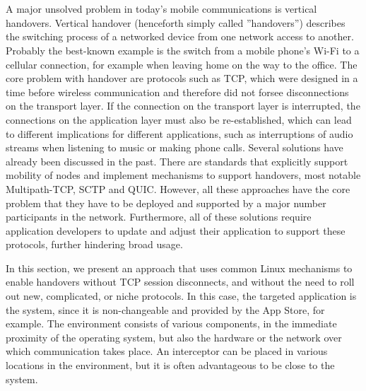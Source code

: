 \section{\wgh}
\label{sec:wg:impl}

\newcommand{\ld}{\texttt{LD\_PRELOAD}\xspace}

A major unsolved problem in today's mobile communications is vertical handovers.
Vertical handover (henceforth simply called ''handovers'') describes the switching process of a networked device from one network access to another.
Probably the best-known example is the switch from a mobile phone's Wi-Fi to a cellular connection, for example when leaving home on the way to the office.
The core problem with handover are protocols such as TCP, which were designed in a time before wireless communication and therefore did not forsee disconnections on the transport layer.
If the connection on the transport layer is interrupted, the connections on the application layer must also be re-established, which can lead to different implications for different applications, such as interruptions of audio streams when listening to music or making phone calls.
Several solutions have already been discussed in the past.
There are standards that explicitly support mobility of nodes and implement mechanisms to support handovers, most notable Multipath-TCP, SCTP and QUIC.
However, all these approaches have the core problem that they have to be deployed and supported by a major number participants in the network.
Furthermore, all of these solutions require application developers to update and adjust their application to support these protocols, further hindering broad usage.

In this section, we present an approach that uses common Linux mechanisms to enable handovers without TCP session disconnects, and without the need to roll out new, complicated, or niche protocols.
In this case, the targeted application is the system, since it is non-changeable and provided by the App Store, for example.
The environment consists of various components, in the immediate proximity of the operating system, but also the hardware or the network over which communication takes place.
An interceptor can be placed in various locations in the environment, but it is often advantageous to be close to the system. 





